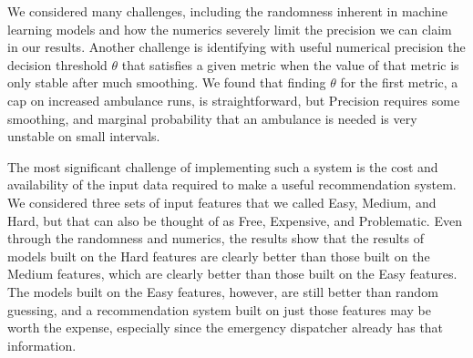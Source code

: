 We considered many challenges, including the randomness inherent in machine learning models and how the numerics severely limit the precision we can claim in our results.  Another challenge is identifying with useful numerical precision the decision threshold $\theta$ that satisfies a given metric when the value of that metric is only stable after much smoothing.  We found that finding $\theta$ for the first metric, a cap on increased ambulance runs, is straightforward, but Precision requires some smoothing, and marginal probability that an ambulance is needed is very unstable on small intervals.

The most significant challenge of implementing such a system is the cost and availability of the input data required to make a useful recommendation system.  We considered three sets of input features that we called Easy, Medium, and Hard, but that can also be thought of as Free, Expensive, and Problematic.  Even through the randomness and numerics, the results show that the results of models built on the Hard features are clearly better than those built on the Medium features, which are clearly better than those built on the Easy features.  The models built on the Easy features, however, are still better than random guessing, and a recommendation system built on just those features may be worth the expense, especially since the emergency dispatcher already has that information.  




